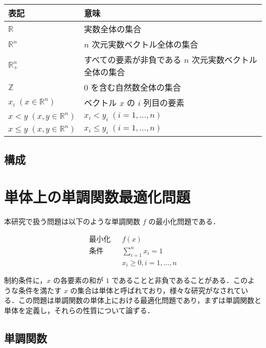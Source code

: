 \documentclass[a4paper,11pt]{jreport}
\begin{document}
\begin{table}[htb]
\begin{tabular}{ll}
表記 & 意味 \\ \hline
$ \mathbb{R} $ & 実数全体の集合 \\
$ \mathbb{R}^n $ & $ n $ 次元実数ベクトル全体の集合 \\
$ \mathbb{R}^n_{+} $ & すべての要素が非負である $ n $ 次元実数ベクトル全体の集合 \\
$ \mathbb{Z} $ & $ 0 $ を含む自然数全体の集合 \\
$ x_i \; (x \in \mathbb{R}^n) $ & ベクトル $ x $ の $ i $ 列目の要素 \\
$ x < y \; (x, y \in \mathbb{R}^n) $ & $ x_i < y_i \; (i = 1, ..., n) $ \\
$ x \leq y \; (x, y \in \mathbb{R}^n) $ & $ x_i \leq y_i \; (i = 1, ..., n) $
\end{tabular}
\end{table}


\section{構成}

\chapter{単体上の単調関数最適化問題}

本研究で扱う問題は以下のような単調関数 $ f $ の最小化問題である．

\begin{align*}
&&&&& 最小化 && f(x) &&&&& \\
&&&&& 条件 && \sum_{i=1}^n x_i = 1\\
&&&&& && x_i \geq 0, i = 1, ..., n
\end{align*}

制約条件に，$ x $ の各要素の和が $ 1 $ であることと非負であることがある．このような条件を満たす $ x $ の集合は単体と呼ばれており，様々な研究がなされている．この問題は単調関数の単体上における最適化問題であり，まずは単調関数と単体を定義し，それらの性質について論ずる．

\section{単調関数}
\end{document}
